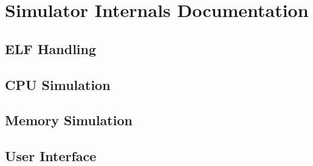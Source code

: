 \documentclass[letterpaper, 11pt, twoside]{article}
\begin{document}
\section[Internals]{Simulator Internals Documentation}

\paragraph{}


\subsection{ELF Handling}
\paragraph{} 

\subsection{CPU Simulation}
\paragraph{}

\subsection{Memory Simulation}
\paragraph{}

\subsection{User Interface}
\paragraph{}

\end{document}
